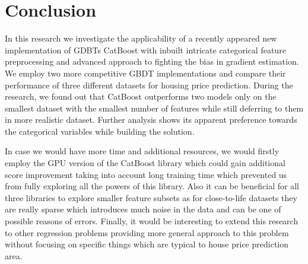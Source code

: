 \section{Conclusion}
\label{sec:conclusion}

In this research we investigate the applicability of a recently appeared new implementation of GDBTs CatBoost with inbuilt intricate categorical feature preprocessing and advanced approach to fighting the bias in gradient estimation. We employ two more competitive GBDT implementations and compare their performance of three different datasets for housing price prediction. During the research, we found out that CatBoost outperforms two models only on the smallest dataset with the smallest number of features while still deferring to them in more realistic dataset. Further analysis shows its apparent preference towards the categorical variables while building the solution.

In case we would have more time and additional resources, we would firstly employ the GPU version of the CatBoost library which could gain additional score improvement taking into account long training time which prevented us from fully exploring all the powers of this library. Also it can be beneficial for all three libraries to explore smaller feature subsets as for close-to-life datasets they are really sparse which introduces much noise in the data and can be one of possible reasons of errors. Finally, it would be interesting to extend this research to other regression problems providing more general approach to this problem without focusing on specific things which are typical to house price prediction area.